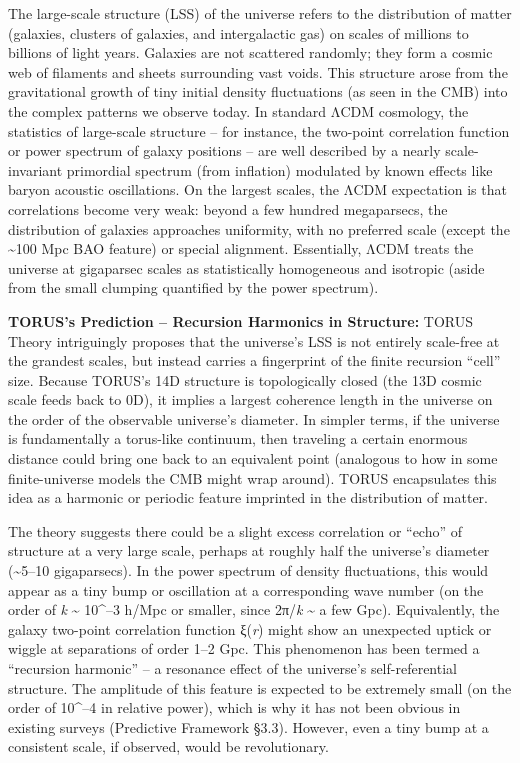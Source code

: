 \documentclass[
]{article}
\begin{document}
The large-scale structure (LSS) of the universe refers to the
distribution of matter (galaxies, clusters of galaxies, and
intergalactic gas) on scales of millions to billions of light years.
Galaxies are not scattered randomly; they form a cosmic web of filaments
and sheets surrounding vast voids. This structure arose from the
gravitational growth of tiny initial density fluctuations (as seen in
the CMB) into the complex patterns we observe today. In standard ΛCDM
cosmology, the statistics of large-scale structure -- for instance, the
two-point correlation function or power spectrum of galaxy positions --
are well described by a nearly scale-invariant primordial spectrum (from
inflation) modulated by known effects like baryon acoustic oscillations.
On the largest scales, the ΛCDM expectation is that correlations become
very weak: beyond a few hundred megaparsecs, the distribution of
galaxies approaches uniformity, with no preferred scale (except the
\textasciitilde100 Mpc BAO feature) or special alignment. Essentially,
ΛCDM treats the universe at gigaparsec scales as statistically
homogeneous and isotropic (aside from the small clumping quantified by
the power spectrum).

\textbf{TORUS's Prediction -- Recursion Harmonics in Structure:} TORUS
Theory intriguingly proposes that the universe's LSS is not entirely
scale-free at the grandest scales, but instead carries a fingerprint of
the finite recursion ``cell'' size. Because TORUS's 14D structure is
topologically closed (the 13D cosmic scale feeds back to 0D), it implies
a largest coherence length in the universe on the order of the
observable universe's diameter. In simpler terms, if the universe is
fundamentally a torus-like continuum, then traveling a certain enormous
distance could bring one back to an equivalent point (analogous to how
in some finite-universe models the CMB might wrap around). TORUS
encapsulates this idea as a harmonic or periodic feature imprinted in
the distribution of matter.

The theory suggests there could be a slight excess correlation or
``echo'' of structure at a very large scale, perhaps at roughly half the
universe's diameter (\textasciitilde5--10 gigaparsecs). In the power
spectrum of density fluctuations, this would appear as a tiny bump or
oscillation at a corresponding wave number (on the order of \emph{k}
\textasciitilde{} 10\^{}--3 h/Mpc or smaller, since 2π/\emph{k}
\textasciitilde{} a few Gpc). Equivalently, the galaxy two-point
correlation function ξ(\emph{r}) might show an unexpected uptick or
wiggle at separations of order 1--2 Gpc. This phenomenon has been termed
a ``recursion harmonic'' -- a resonance effect of the universe's
self-referential structure. The amplitude of this feature is expected to
be extremely small (on the order of 10\^{}--4 in relative power), which
is why it has not been obvious in existing surveys (Predictive Framework
§3.3). However, even a tiny bump at a consistent scale, if observed,
would be revolutionary.
\end{document}
